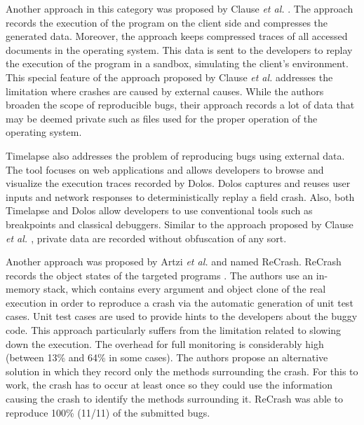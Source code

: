Another approach in this category was  proposed by Clause {\it et al.} \cite{Clause2007}.
The approach records the execution of the program on the client side and compresses the generated data.
Moreover, the approach keeps compressed traces of all accessed documents in the operating system.
This data is sent to the developers to replay the execution of the program in a sandbox, simulating the client's environment.
This special feature of the approach proposed by Clause {\it et al.} addresses the limitation where crashes are caused by external causes.
While the authors broaden the scope of reproducible bugs, their approach records a lot of data that may be deemed private such as files used for the proper operation of the operating system.

Timelapse \cite{Burg2013} also addresses the problem of reproducing bugs using external data.
The tool focuses on web applications and allows developers to browse and visualize the execution traces recorded by Dolos. Dolos captures and reuses user inputs and network responses to deterministically replay a field crash.
Also, both Timelapse and Dolos allow developers to use conventional tools such as breakpoints and classical debuggers. Similar to the approach proposed by Clause {\it et al. \cite{Clause2007}}, private data are recorded without obfuscation of any sort.

Another approach was proposed by Artzi {\it et al.} and named ReCrash.
ReCrash records the object states of the targeted programs \cite{Artzi2008}.
The authors use an in-memory stack, which contains every argument and object clone of the real execution in order to reproduce a crash via the automatic generation of unit test cases.
Unit test cases are used to provide hints to the developers about the buggy code.
This approach particularly suffers from the limitation related to slowing down the execution.
The overhead for full monitoring is considerably high (between 13\% and 64\% in some cases).
The authors  propose an alternative solution in which they record only the methods surrounding the crash.
For this to work, the crash has to occur at least once so they could use the information causing the crash to identify the methods surrounding it.
ReCrash was able to reproduce 100\% (11/11) of the submitted bugs.

